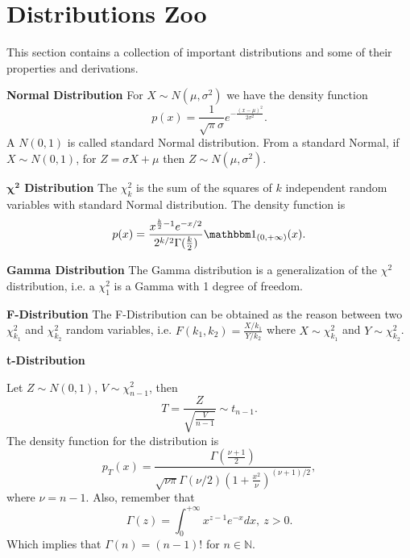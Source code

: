 \section{Distributions Zoo}
This section contains a collection of important distributions and some of
their properties and derivations.

\begin{shaded}\textbf{Normal Distribution}
	For $X \sim N(\mu, \sigma^2)$ we have the density function
	\begin{equation}
		p(x) = \frac{1}{\sqrt \pi \sigma} e^{-\frac{(x-\mu)^2}{2\sigma^2}}.
	\end{equation}
	A $N(0,1)$ is called standard Normal distribution. From a
	standard Normal, if $X \sim N(0,1)$,
	for $Z = \sigma X + \mu$ then $Z \sim N(\mu,\sigma^2)$.
\end{shaded}

\begin{shaded}\textbf{$\bm{\chi^2}$ Distribution}
	The $\chi^2_k$ is the sum of the squares of $k$ independent
	random variables with standard Normal distribution.
	The density function is
	\begin{equation}
		p(x) = \frac{x^{\frac{k}{2}-1}e^{-x/2}}{2^{k/2} \Gamma(\frac{k}{2})}
		\mathbbm 1_{(0,+\infty)}(x).
	\end{equation}
\end{shaded}

\begin{shaded}\textbf{Gamma Distribution}
	The Gamma distribution is a generalization of the $\chi^2$
	distribution, i.e. a $\chi^2_1$ is a Gamma with 1 degree of freedom.
\end{shaded}

\begin{shaded}\textbf{F-Distribution}
	The F-Distribution can be obtained as the reason between
	two $\chi^2_{k_1}$ and $\chi^2_{k_2}$ random variables, i.e.
	$F(k_1, k_2) = \frac{X/k_1}{Y/k_2}$ where
	$X \sim \chi^2_{k_1}$ and
	$Y \sim \chi^2_{k_2}$.
\end{shaded}

\begin{shaded}\textbf{t-Distribution}
	\vspace{5mm}

	Let $Z \sim N(0,1)$, $V \sim \chi_{n-1}^2$, then
	\begin{equation}
		T = \frac{Z}{\sqrt{\frac{V}{n-1}}} \sim
		t_{n-1}.
	\end{equation}
	The density function for the distribution is
	\begin{equation}
		p_T(x) = \frac{\Gamma(\frac{\nu+1}{2})}{\sqrt{\nu\pi}\Gamma(\nu/2)
			(1+\frac{x^2}{\nu})^{(\nu+1)/2}},
	\end{equation}
	where $\nu = n-1$. Also, remember that
	\begin{equation}
		\Gamma(z) = \int_0^{+\infty}x^{z-1}e^{-x}dx, \ z>0.
	\end{equation}
	Which implies that $\Gamma(n) = (n-1)!$ for $n\in \mathbb N$.
\end{shaded}

